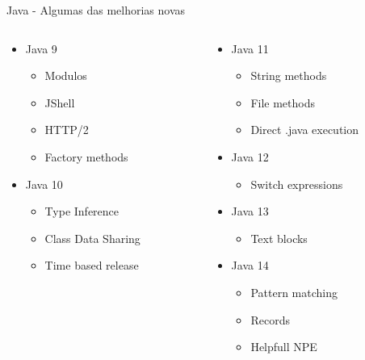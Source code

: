 \documentclass[aspectratio=169]{beamer}
\begin{document}
\begin{frame}[fragile]{Java - Algumas das melhorias novas}
\begin{columns}[T]
		\begin{column}[T]{5cm} %
			\begin{itemize}
				\item Java 9
				\begin{itemize}
					\item Modulos
					\item JShell
					\item HTTP/2
                    \item Factory methods
				\end{itemize}
				\item Java 10
				\begin{itemize}
					\item Type Inference
					\item Class Data Sharing
					\item Time based release
				\end{itemize}
			\end{itemize}
		\end{column}
		\begin{column}[T]{5cm} %
			\begin{itemize}
                \item Java 11
                \begin{itemize}
                    \item String methods
                    \item File methods
                    \item Direct .java execution
                \end{itemize}
				\item Java 12
				\begin{itemize}
					\item Switch expressions
				\end{itemize}
				\item Java 13
				\begin{itemize}
					\item Text blocks
				\end{itemize}
				\item Java 14
				\begin{itemize}
					\item Pattern matching
					\item Records
					\item Helpfull NPE
				\end{itemize}
			\end{itemize}
		\end{column}
	\end{columns}
\end{frame}
\end{document}

